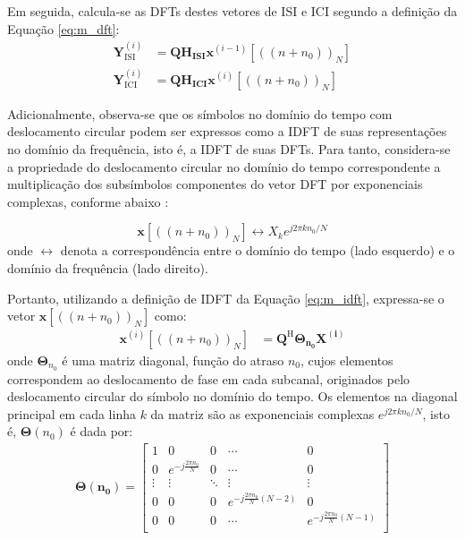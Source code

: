Em seguida, calcula-se as DFTs destes vetores de ISI e ICI segundo a definição da Equação \ref{eq:m_dft}:
\begin{align}
\mathbf{Y}_\text{ISI}^{(i)} &= \mathbf{Q} \mathbf{ H_\text{ISI}} \mathbf{x}^{(i-1)}[((n + n_0))_N]
\label{eq:partial_ISI_DFT}\\
\mathbf{Y}_\text{ICI}^{(i)} &= \mathbf{Q} \mathbf{ H_\text{ICI}} \mathbf{x}^{(i)}[((n + n_0))_N] 
\label{eq:partial_ICI_DFT}
\end{align}

Adicionalmente, observa-se que os símbolos no domínio do tempo com deslocamento circular podem ser expressos como a IDFT de suas representações no domínio da frequência, isto é, a IDFT de suas DFTs. Para tanto, considera-se a propriedade do deslocamento circular no domínio do tempo correspondente a multiplicação dos subsímbolos componentes do vetor DFT por exponenciais complexas, conforme abaixo \cite{dspambardar}:

$$ \mathbf{x}[((n + n_0))_N] \leftrightarrow X_ke^{j2\pi k n_0/N} $$
onde $\leftrightarrow$ denota a correspondência entre o domínio do tempo (lado esquerdo) e o domínio da frequência (lado direito).


Portanto, utilizando a definição de IDFT da Equação \ref{eq:m_idft}, expressa-se o vetor $ \mathbf{x}[((n + n_0))_N]$ como:
\begin{align}
\mathbf{x}^{(i)}[((n + n_0))_N] &=  \mathbf{Q}^\text{H} \mathbf{\Theta_{n_0} \mathbf{X^{(i)}}}  
\label{eq:x_circ_shift_time}
\end{align}
onde $\mathbf{\Theta}_{n_0}$ é uma matriz diagonal, função do atraso $n_0$, cujos elementos correspondem ao deslocamento de fase em cada subcanal, originados pelo deslocamento circular do símbolo no domínio do tempo. Os elementos na diagonal principal em cada linha $k$ da matriz são as exponenciais complexas $e^{j2\pi k n_0/N}$, isto é, $\mathbf{\Theta}(n_0)$ é dada por:
\begin{align}
\mathbf{\Theta(n_0)} = \left[ \begin{array}{ccccc}
1 & 0 & 0 & \cdots & 0\\
0 & e^{-j\frac{2\pi n_0}{N}} & 0 & \cdots & 0\\
\vdots & \vdots & \ddots & \vdots & \vdots\\
0 & 0 & 0 & e^{-j\frac{2\pi n_0}{N}(N-2)} & 0\\
0 & 0 & 0 & \cdots & e^{-j\frac{2\pi n_0}{N}(N-1)}\\
\end{array} \right]
\end{align}

